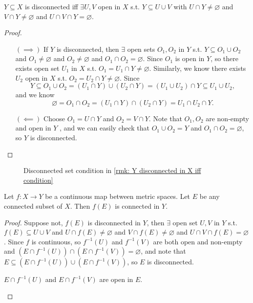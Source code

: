 \begin{remark} \label{rmk: Y disconnected in X iff condition}
    \(Y \subseteq X\) is disconnected iff \(\exists U, V\) open in \(X\) s.t. \(Y \subseteq U \cup V\) with \(U \cap Y \neq \varnothing \) and \(V \cap Y \neq \varnothing \) and \(U \cap V \cap Y = \varnothing \).        
\end{remark}
\begin{proof}
    \vphantom{text} 
    \begin{itemize}
        \item [\((\implies )\)] If \(Y\) is disconnected, then \(\exists \) open sets \(O_1, O_2\) in \(Y\) s.t. \(Y \subseteq O_1 \cup O_2\) and \(O_1 \neq \varnothing \) and \(O_2 \neq \varnothing \) and \(O_1 \cap O_2 = \varnothing \). Since \(O_1\) is open in \(Y\), so there exists open set \(U_1\) in \(X\) s.t. \(O_1 = U_1 \cap Y \neq \varnothing \). Similarly, we know there exists \(U_2\) open in \(X\) s.t. \(O_2 = U_2 \cap Y \neq \varnothing \). Since 
        \[
            Y \subseteq O_1 \cup O_2 = (U_1 \cap Y) \cup (U_2 \cap Y) = (U_1 \cup U_2) \cap Y \subseteq U_1 \cup U_2,
        \] and we know
        \[
            \varnothing = O_1 \cap O_2 = (U_1 \cap Y) \cap (U_2 \cap Y) = U_1 \cap U_2 \cap Y.
        \]
        \item [\((\impliedby )\)] Choose \(O_1 = U \cap Y\) and \(O_2 = V \cap Y\). Note that \(O_1, O_2 \) are non-empty and open in \(Y\) , and we can easily check that \(O_1 \cup O_2 = Y\) and \(O_1 \cap O_2 = \varnothing \), so \(Y\) is disconnected.       
    \end{itemize}
\end{proof}
\begin{figure}[H]
    \centering
    \caption{Disconnected set condition in \autoref{rmk: Y disconnected in X iff condition}}
    \label{fig:disconnectedSet}
\end{figure}
\begin{theorem}
    Let \(f : X \to Y\) be a continuous map between metric spaces. Let \(E\) be any connected subset of \(X\). Then \(f(E)\) is connected in \(Y\).     
\end{theorem}
\begin{proof}
    Suppose not, \(f(E)\) is disconnected in \(Y\), then \(\exists \) open set \(U, V\) in \(Y\) s.t. \(f(E) \subseteq U \cup V\) and \(U \cap f(E) \neq \varnothing \) and \(V \cap f(E) \neq \varnothing \) and \(U \cap V \cap f(E) = \varnothing \). Since \(f\) is continuous, so \(f^{-1}(U)\) and \(f^{-1}(V)\) are both open and non-empty and \(\left( E \cap  f^{-1}(U) \right)  \cap \left( E \cap f^{-1}(V) \right)  = \varnothing \), and note that \(E \subseteq \left( E \cap  f^{-1}(U) \right)  \cup \left( E \cap f^{-1}(V) \right)\), so \(E\) is disconnected.         
    \begin{remark}
        \(E \cap f^{-1}(U)\) and \(E \cap f^{-1}(V)\) are open in \(E\).   
    \end{remark}     
\end{proof}

